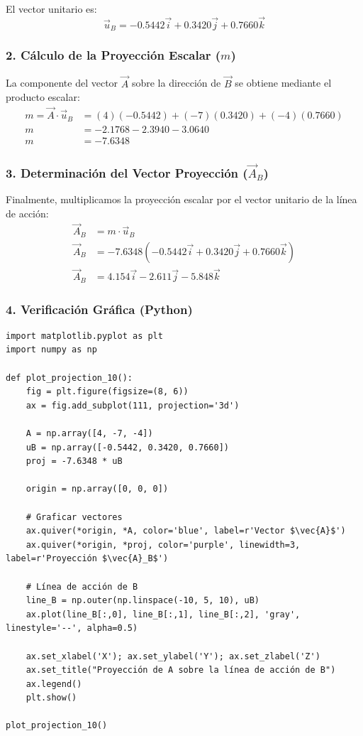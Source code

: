\documentclass[12pt, a4paper]{article}
\begin{document}
El vector unitario es:
\begin{equation*}
    \vec{u}_B = -0.5442\vec{i} + 0.3420\vec{j} + 0.7660\vec{k}
\end{equation*}

\subsubsection*{2. Cálculo de la Proyección Escalar ($m$)}
La componente del vector $\vec{A}$ sobre la dirección de $\vec{B}$ se obtiene mediante el producto escalar:
\begin{align*}
    m = \vec{A} \cdot \vec{u}_B &= (4)(-0.5442) + (-7)(0.3420) + (-4)(0.7660) \\
    m &= -2.1768 - 2.3940 - 3.0640 \\
    m &= -7.6348
\end{align*}

\subsubsection*{3. Determinación del Vector Proyección ($\vec{A}_B$)}
Finalmente, multiplicamos la proyección escalar por el vector unitario de la línea de acción:
\begin{align*}
    \vec{A}_B &= m \cdot \vec{u}_B \\
    \vec{A}_B &= -7.6348 (-0.5442\vec{i} + 0.3420\vec{j} + 0.7660\vec{k}) \\
    \vec{A}_B &= 4.154\vec{i} - 2.611\vec{j} - 5.848\vec{k}
\end{align*}

\subsubsection*{4. Verificación Gráfica (Python)}
\begin{lstlisting}
import matplotlib.pyplot as plt
import numpy as np

def plot_projection_10():
    fig = plt.figure(figsize=(8, 6))
    ax = fig.add_subplot(111, projection='3d')
    
    A = np.array([4, -7, -4])
    uB = np.array([-0.5442, 0.3420, 0.7660])
    proj = -7.6348 * uB
    
    origin = np.array([0, 0, 0])
    
    # Graficar vectores
    ax.quiver(*origin, *A, color='blue', label=r'Vector $\vec{A}$')
    ax.quiver(*origin, *proj, color='purple', linewidth=3, label=r'Proyección $\vec{A}_B$')
    
    # Línea de acción de B
    line_B = np.outer(np.linspace(-10, 5, 10), uB)
    ax.plot(line_B[:,0], line_B[:,1], line_B[:,2], 'gray', linestyle='--', alpha=0.5)
    
    ax.set_xlabel('X'); ax.set_ylabel('Y'); ax.set_zlabel('Z')
    ax.set_title("Proyección de A sobre la línea de acción de B")
    ax.legend()
    plt.show()

plot_projection_10()
\end{lstlisting}
\end{document}
